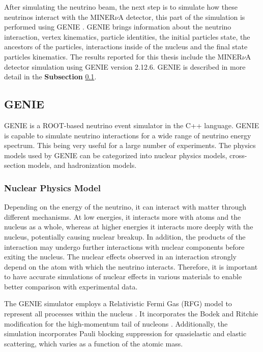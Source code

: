 After simulating the neutrino beam, the next step is to simulate how these neutrinos interact with the MINER$\nu$A detector, this part of the simulation is performed using GENIE \cite{Genie}. GENIE brings information about the neutrino interaction, vertex kinematics, particle identities, the initial particles state, the ancestors of the particles, interactions inside of the nucleus and the final state particles kinematics. The results reported for this thesis include the MINER$\nu$A detector simulation using GENIE version 2.12.6. GENIE is described in more detail in the \textbf{Subsection} \ref{Cap:Simulation:GENIE}.

\subsection{GENIE}
\label{Cap:Simulation:GENIE}
GENIE is a ROOT-based neutrino event simulator in the C++ language. GENIE is capable to simulate neutrino interactions for a wide range of neutrino energy spectrum. This being very useful for a large number of experiments. The physics models used by GENIE can be categorized into nuclear physics models, cross-section models, and hadronization models.

\subsubsection{Nuclear Physics Model}
\label{Cap:Simulation:GENIE:NuclearPhysicsModel}

Depending on the energy of the neutrino, it can interact with matter through different mechanisms. At low energies, it interacts more with atoms and the nucleus as a whole, whereas at higher energies it interacts more deeply with the nucleus, potentially causing nuclear breakup. In addition, the products of the interaction may undergo further interactions with nuclear components before exiting the nucleus. The nuclear effects observed in an interaction strongly depend on the atom with which the neutrino interacts. Therefore, it is important to have accurate simulations of nuclear effects in various materials to enable better comparison with experimental data.

The GENIE simulator employs a Relativistic Fermi Gas (RFG) model to represent all processes within the nucleus \cite{RFGPhysRevC.80.065501}. It incorporates the Bodek and Ritchie modification for the high-momentum tail of nucleons \cite{BodekRichiePhysRevD.24.1400}. Additionally, the simulation incorporates Pauli blocking suppression for quasielastic and elastic scattering, which varies as a function of the atomic mass.

